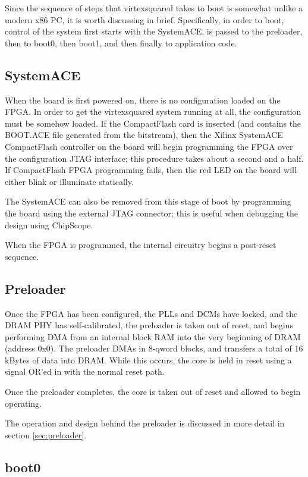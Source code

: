 \documentclass[10pt]{article}
\begin{document}
Since the sequence of steps that virtexsquared takes to boot is somewhat
unlike a modern x86 PC, it is worth discussing in brief. Specifically, in
order to boot, control of the system first starts with the SystemACE, is
passed to the preloader, then to boot0, then boot1, and then finally to
application code.

\subsection{SystemACE}

When the board is first powered on, there is no configuration loaded on the
FPGA. In order to get the virtexsquared system running at all, the
configuration must be somehow loaded. If the CompactFlash card is inserted
(and contains the BOOT.ACE file generated from the bitstream), then the
Xilinx SystemACE CompactFlash controller on the board will begin programming
the FPGA over the configuration JTAG interface; this procedure takes about a
second and a half. If CompactFlash FPGA programming fails, then the red LED
on the board will either blink or illuminate statically.

The SystemACE can also be removed from this stage of boot by programming the
board using the external JTAG connector; this is useful when debugging the
design using ChipScope.

When the FPGA is programmed, the internal circuitry begins a post-reset
sequence.

\subsection{Preloader}

Once the FPGA has been configured, the PLLs and DCMs have locked, and the
DRAM PHY has self-calibrated, the preloader is taken out of reset, and
begins performing DMA from an internal block RAM into the very beginning of
DRAM (address 0x0). The preloader DMAs in 8-qword blocks, and transfers a
total of 16 kBytes of data into DRAM. While this occurs, the core is held in
reset using a signal OR'ed in with the normal reset path.

Once the preloader completes, the core is taken out of reset and allowed to
begin operating.

The operation and design behind the preloader is discussed in more detail in
section \ref{sec:preloader}.

\subsection{boot0}
\end{document}
